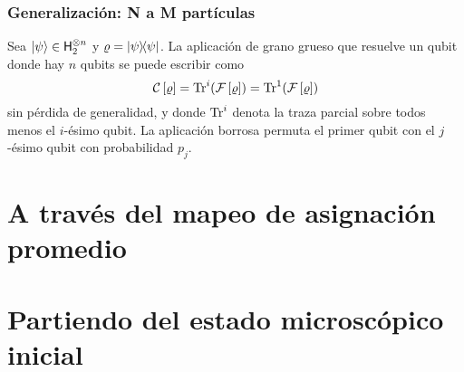 \subsubsection{Generalización: N a M partículas}

Sea $\ket{\psi}\in{\sf H}_{2}^{\otimes n}$ y $\varrho=\dyad{\psi}$. La aplicación de grano grueso que resuelve un qubit donde hay $n$ qubits se puede escribir como
\begin{equation*}
    \mathcal{C}\left[\varrho\right]=\Tr^{i}(\mathcal{F}\left[\varrho\right])=\Tr^{1}(\mathcal{F}\left[\varrho\right])
\end{equation*}
sin pérdida de generalidad, y donde $\Tr^{i}$ denota la traza parcial sobre todos menos el $i$-ésimo qubit. La aplicación borrosa permuta el primer qubit con el $j$-ésimo qubit con probabilidad $p_{j}$.

\section{A través del mapeo de asignación promedio}

\section{Partiendo del estado microscópico inicial}
